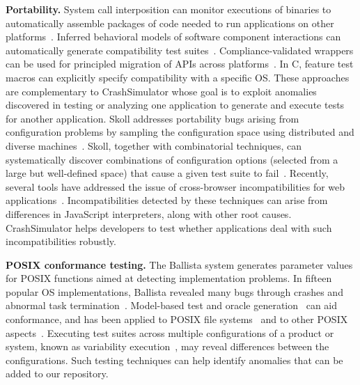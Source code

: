 \noindent
{\bf Portability.}
System call interposition can monitor executions of binaries to automatically
assemble packages of code needed to run applications on other
platforms~\cite{Guo:2011:CUS:2002181.2002202}.
%
Inferred behavioral models of
software component interactions can automatically generate compatibility test
suites~\cite{mariani2007compatibility}. Compliance-validated wrappers can be
used for principled migration of APIs across
platforms~\cite{bartolomeicompliance}.
In C, feature test macros can explicitly specify compatibility
with a specific OS.
These approaches are complementary to 
CrashSimulator
whose goal is to 
exploit anomalies discovered in testing or analyzing one
application to generate and execute tests for another application.
%
Skoll addresses portability bugs arising from configuration problems by
sampling the configuration space using distributed and diverse
machines~\cite{skoll:icse:2004}. Skoll, together with combinatorial
techniques, can systematically discover combinations of configuration options
(selected from a large but well-defined space) that cause a given test suite
to fail~\cite{Yilmaz:issta:2004, Fouche:issta:2009}. 
Recently, several tools have addressed the issue of cross-browser
incompatibilities for web applications~\cite{DBLP:conf/icse/Choudhary11,
DBLP:conf/icsm/ChoudharyVO10,
Mesbah:2011:ACC:1985793.1985870,silakov2010improving}.
Incompatibilities detected by
these techniques can arise from differences in JavaScript
interpreters, along with other root causes.
CrashSimulator helps developers to test 
whether applications deal with  such incompatibilities robustly.

\noindent
{\bf POSIX conformance testing.}
The Ballista system generates parameter values for POSIX functions aimed at
detecting implementation problems. In fifteen popular OS implementations,
Ballista revealed many bugs through crashes and abnormal task
termination~\cite{Koopman00theexception}.
%
Model-based test and oracle
generation~\cite{Pretschner:2005:MT:1062455.1062636, JVCS07} can aid
conformance, and has been applied to POSIX file
systems~\cite{Dadeau:2008:CSM:1433121.1433137} and to other POSIX
aspects~\cite{Farchi02}.
Executing test suites across multiple configurations of a product or system,
known as variability execution~\cite{Nguyen14, Kastner12}, may reveal
differences between the configurations.
Such testing techniques can help identify
anomalies that can be added to our repository.

